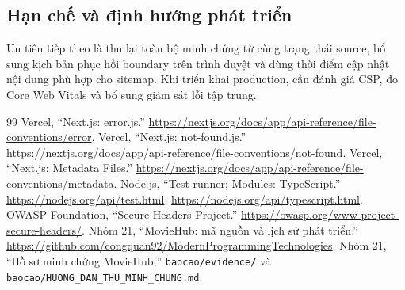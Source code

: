 \documentclass[12pt,a4paper]{extarticle}
\begin{document}
\subsection{Hạn chế và định hướng phát triển}
Ưu tiên tiếp theo là thu lại toàn bộ minh chứng từ cùng trạng thái source, bổ sung kịch bản phục hồi boundary trên trình duyệt và dùng thời điểm cập nhật nội dung phù hợp cho sitemap. Khi triển khai production, cần đánh giá CSP, đo Core Web Vitals và bổ sung giám sát lỗi tập trung.

\vspace{-0.1cm}
\begin{thebibliography}{99}
\fontsize{8.5}{11}\selectfont
\setlength{\itemsep}{0pt}
 Vercel, ``Next.js: error.js.'' \url{https://nextjs.org/docs/app/api-reference/file-conventions/error}.
 Vercel, ``Next.js: not-found.js.'' \url{https://nextjs.org/docs/app/api-reference/file-conventions/not-found}.
 Vercel, ``Next.js: Metadata Files.'' \url{https://nextjs.org/docs/app/api-reference/file-conventions/metadata}.
 Node.js, ``Test runner; Modules: TypeScript.'' \url{https://nodejs.org/api/test.html}; \url{https://nodejs.org/api/typescript.html}.
 OWASP Foundation, ``Secure Headers Project.'' \url{https://owasp.org/www-project-secure-headers/}.
 Nhóm 21, ``MovieHub: mã nguồn và lịch sử phát triển.'' \url{https://github.com/congquan92/ModernProgrammingTechnologies}.
 Nhóm 21, ``Hồ sơ minh chứng MovieHub,'' \nolinkurl{baocao/evidence/} và \nolinkurl{baocao/HUONG_DAN_THU_MINH_CHUNG.md}.
\end{thebibliography}
\end{document}
